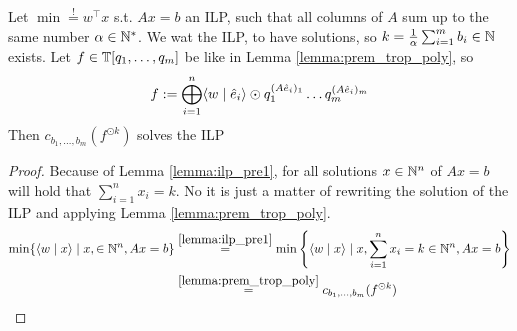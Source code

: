 \begin{theorem}
    Let $\min \stackrel{!}{=} w^\top x$ s.t. $Ax=b$ an ILP, such that all columns of $A$ sum up to the same number $\alpha \in \mathbb{N}^*$. We wat the ILP, to have solutions, so $k = \frac{1}{\alpha}\sum_{i=1}^{m}b_i \in \mathbb{N}$ exists. Let $f \in \mathbb{T}[q_1, \dots, q_m]$ be like in Lemma \ref{lemma:prem_trop_poly}, so 
    $$f := \bigoplus_{i=1}^{n} \langle w \mid \hat e_i \rangle\odot  q_1^{(A\hat e_i)_1}\dots q_m^{(A\hat e_i)_m}$$
    Then $c_{b_1, \dots, b_m}(f^{\odot k})$ solves the ILP 
\end{theorem}

\begin{proof}
    Because of Lemma \ref{lemma:ilp_pre1}, for all solutions $x \in \mathbb{N}^n$ of $Ax=b$ will hold that $\sum_{i=1}^{n}x_i = k$. No it is just a matter of rewriting the solution of the ILP and applying Lemma \ref{lemma:prem_trop_poly}.
    \begin{align*}
        \min\{\langle w \mid x \rangle \mid x, \in \mathbb{N}^n, Ax=b\} &\stackrel{\ref{lemma:ilp_pre1}}{=} \min\left\{\langle w \mid x \rangle \mid x, \sum_{i=1}^{n}x_i = k \in \mathbb{N}^n, Ax=b\right\}\\
        &\stackrel{\ref{lemma:prem_trop_poly}}{=} c_{b_1, \dots, b_m}(f^{\odot k})
    \end{align*}
\end{proof}